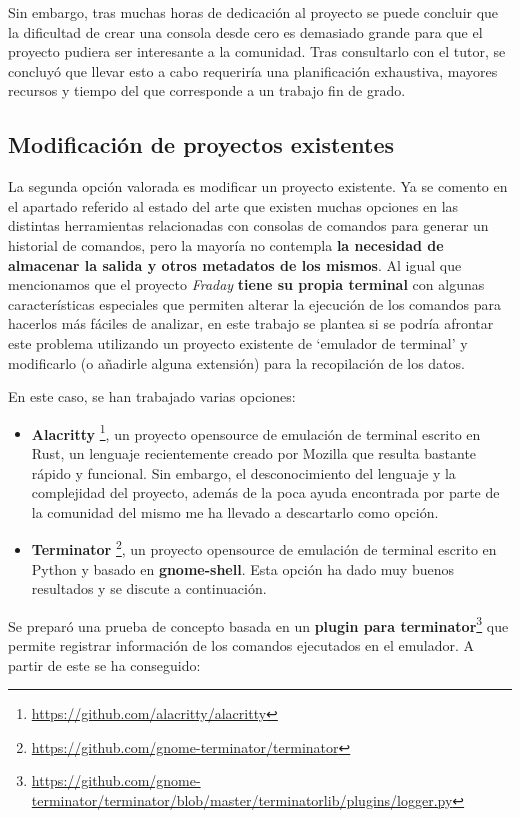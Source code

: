Sin embargo, tras muchas horas de dedicación al proyecto se puede concluir que la dificultad de crear una consola desde cero es demasiado grande para que el proyecto pudiera ser interesante a la comunidad. Tras consultarlo con el tutor, se concluyó que llevar esto a cabo requeriría una planificación exhaustiva, mayores recursos y tiempo del que corresponde a un trabajo fin de grado. 



\subsection{Modificación de proyectos existentes}

La segunda opción valorada es modificar un proyecto existente. Ya se comento en el apartado referido al estado del arte \cite{sec:estado del arte} que existen muchas opciones en las distintas herramientas relacionadas con consolas de comandos para generar un historial de comandos, pero la mayoría no contempla \textbf{la necesidad de almacenar la salida y otros metadatos de los mismos}. Al igual que mencionamos que el proyecto \textit{Fraday} \textbf{tiene su propia terminal} con algunas características especiales que permiten alterar la ejecución de los comandos para hacerlos más fáciles de analizar, en este trabajo se plantea si se podría afrontar este problema utilizando un proyecto existente de `emulador de terminal' y modificarlo (o añadirle alguna extensión) para la recopilación de los datos.

En este caso, se han trabajado varias opciones: 

\begin{itemize}
    \item \textbf{Alacritty} \footnote{\url{https://github.com/alacritty/alacritty}}, un proyecto opensource de emulación de terminal escrito en Rust, un lenguaje recientemente creado por Mozilla que resulta bastante rápido y funcional. Sin embargo, el desconocimiento del lenguaje y la complejidad del proyecto, además de la poca ayuda encontrada por parte de la comunidad del mismo me ha llevado a descartarlo como opción.
    \item \textbf{Terminator} \footnote{\url{https://github.com/gnome-terminator/terminator}}, un proyecto opensource de emulación de terminal escrito en Python y basado en \textbf{gnome-shell}. Esta opción ha dado muy buenos resultados y se discute a continuación.
\end{itemize}


Se preparó una prueba de concepto basada en un \textbf{plugin para terminator}\footnote{\url{https://github.com/gnome-terminator/terminator/blob/master/terminatorlib/plugins/logger.py}} que permite registrar información de los comandos ejecutados en el emulador. A partir de este se ha conseguido:

